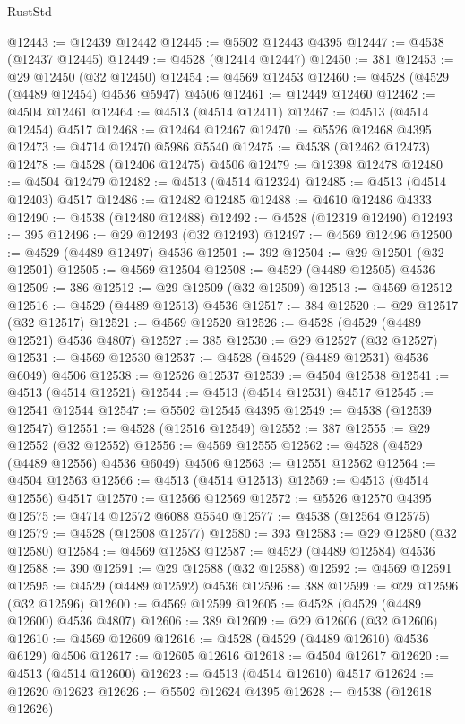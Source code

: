 \begin{lexlean}{RustStd}
\begin{coremodule}
@12443 := @12439 @12442
@12445 := @5502 @12443 @4395
@12447 := @4538 (@12437 @12445)
@12449 := @4528 (@12414 @12447)
@12450 := 381
@12453 := @29 @12450 (@32 @12450)
@12454 := @4569 @12453
@12460 := @4528 (@4529 (@4489 @12454) @4536 @5947) @4506
@12461 := @12449 @12460
@12462 := @4504 @12461
@12464 := @4513 (@4514 @12411)
@12467 := @4513 (@4514 @12454) @4517
@12468 := @12464 @12467
@12470 := @5526 @12468 @4395
@12473 := @4714 @12470 @5986 @5540
@12475 := @4538 (@12462 @12473)
@12478 := @4528 (@12406 @12475) @4506
@12479 := @12398 @12478
@12480 := @4504 @12479
@12482 := @4513 (@4514 @12324)
@12485 := @4513 (@4514 @12403) @4517
@12486 := @12482 @12485
@12488 := @4610 @12486 @4333
@12490 := @4538 (@12480 @12488)
@12492 := @4528 (@12319 @12490)
@12493 := 395
@12496 := @29 @12493 (@32 @12493)
@12497 := @4569 @12496
@12500 := @4529 (@4489 @12497) @4536
@12501 := 392
@12504 := @29 @12501 (@32 @12501)
@12505 := @4569 @12504
@12508 := @4529 (@4489 @12505) @4536
@12509 := 386
@12512 := @29 @12509 (@32 @12509)
@12513 := @4569 @12512
@12516 := @4529 (@4489 @12513) @4536
@12517 := 384
@12520 := @29 @12517 (@32 @12517)
@12521 := @4569 @12520
@12526 := @4528 (@4529 (@4489 @12521) @4536 @4807)
@12527 := 385
@12530 := @29 @12527 (@32 @12527)
@12531 := @4569 @12530
@12537 := @4528 (@4529 (@4489 @12531) @4536 @6049) @4506
@12538 := @12526 @12537
@12539 := @4504 @12538
@12541 := @4513 (@4514 @12521)
@12544 := @4513 (@4514 @12531) @4517
@12545 := @12541 @12544
@12547 := @5502 @12545 @4395
@12549 := @4538 (@12539 @12547)
@12551 := @4528 (@12516 @12549)
@12552 := 387
@12555 := @29 @12552 (@32 @12552)
@12556 := @4569 @12555
@12562 := @4528 (@4529 (@4489 @12556) @4536 @6049) @4506
@12563 := @12551 @12562
@12564 := @4504 @12563
@12566 := @4513 (@4514 @12513)
@12569 := @4513 (@4514 @12556) @4517
@12570 := @12566 @12569
@12572 := @5526 @12570 @4395
@12575 := @4714 @12572 @6088 @5540
@12577 := @4538 (@12564 @12575)
@12579 := @4528 (@12508 @12577)
@12580 := 393
@12583 := @29 @12580 (@32 @12580)
@12584 := @4569 @12583
@12587 := @4529 (@4489 @12584) @4536
@12588 := 390
@12591 := @29 @12588 (@32 @12588)
@12592 := @4569 @12591
@12595 := @4529 (@4489 @12592) @4536
@12596 := 388
@12599 := @29 @12596 (@32 @12596)
@12600 := @4569 @12599
@12605 := @4528 (@4529 (@4489 @12600) @4536 @4807)
@12606 := 389
@12609 := @29 @12606 (@32 @12606)
@12610 := @4569 @12609
@12616 := @4528 (@4529 (@4489 @12610) @4536 @6129) @4506
@12617 := @12605 @12616
@12618 := @4504 @12617
@12620 := @4513 (@4514 @12600)
@12623 := @4513 (@4514 @12610) @4517
@12624 := @12620 @12623
@12626 := @5502 @12624 @4395
@12628 := @4538 (@12618 @12626)

\end{coremodule}
\end{lexlean}
